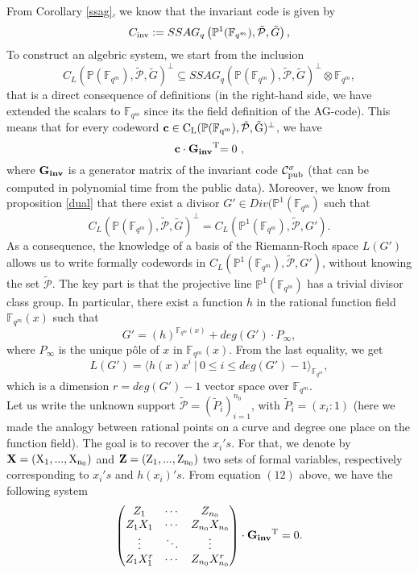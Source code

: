 \documentclass[10pt]{article}
\newcommand{\cd}{\cdot}
\newcommand{\fqm}{\mathbb{F}_{q^m}}
\newcommand{\su}{\subseteq}
\newcommand{\PR}{\mathcal{P}}
\begin{document}
From Corollary \ref{ssag}, we know that the invariant code is given by 
\[C_{\rm{inv}} := SSAG_q\left(\mathbb{P}^1(\fqm),\tilde{\PR},\tilde{G}\right),\]
To construct an algebric system, we start from the inclusion 
\[C_L(\mathbb{P}(\fqm),\tilde{\PR},\tilde{G})^{\perp} \su SSAG_q(\mathbb{P}(\fqm),\tilde{\PR},\tilde{G})^{\perp} \otimes \fqm,\]
that is a direct consequence of definitions (in the right-hand side, we have extended the scalars to $\fqm$ since its the field definition of the AG-code). This means that for every codeword $\bf{c} \rm \in C_L(\mathbb{P}(\fqm),\tilde{\PR},\tilde{G})^{\perp}$, we have 
\begin{equation}
\bf{c \cd G_{inv}}^{\rm{T}}  \rm {= 0}\ ,
\end{equation}
where $\bf{G_{inv}}$ is a generator matrix of the invariant code $\mathcal{C}_{\rm pub}^{\sigma}$ (that can be computed in polynomial time from the public data). Moreover, we know from proposition \ref{dual} that there exist a divisor $G' \in Div(\mathbb{P}^1(\fqm)$ such that
\[ C_L(\mathbb{P}(\fqm),\tilde{\PR},\tilde{G})^{\perp} = C_L(\mathbb{P}^1(\fqm),\tilde{\PR},G').\]
As a consequence, the knowledge of a basis of the Riemann-Roch space $L(G')$ allows us to write formally codewords in $C_L(\mathbb{P}^1(\fqm),\tilde{\PR},G')$, without knowing the set $\tilde{\PR}$. The key part is that the projective line $\mathbb{P}^1(\fqm)$ has a trivial divisor class group. In particular, there exist a function $h$ in the rational function field $\fqm(x)$ such that
\[ G' = (h)^{\fqm(x)} + deg(G') \cd P_{\infty},\]
where $P_{\infty}$ is the unique pôle of $x$ in $\fqm(x)$. From the last equality, we get
\[L(G') = \langle h(x)x^i \ | \ 0 \leq i \leq deg(G')-1\rangle_{\fqm},\]
which is a dimension $r=deg(G')-1$ vector space over $\fqm$. \\
Let us write the unknown support $\tilde{\PR} = (\tilde{P}_i)_{i=1}^{n_0}$, with $\tilde{P}_i=(x_i:1)$ (here we made the analogy between rational points on a curve and degree one place on the function field). The goal is to recover the $x_i's$. For that, we denote by  
$\bf{X} \rm = (X_1,...,X_{n_0})$ and $\bf{Z} \rm = (Z_1,...,Z_{n_0})$ two sets of formal variables, respectively corresponding to $x_i's$ and $h(x_i)'s$. From equation $(12)$ above, we have the following system
\begin{equation*}
\begin{pmatrix}
Z_1 & \cdots & Z_{n_0} \\
Z_1X_1 & \cdots & Z_{n_0}X_{n_0} \\
\vdots & \ddots & \vdots \\
Z_1X_1^r & \cdots & Z_{n_0}X_{n_0}^r 
\end{pmatrix}
\cd \bf{G_{inv}} \rm{^T} = 0.
\end{equation*}
\end{document}

